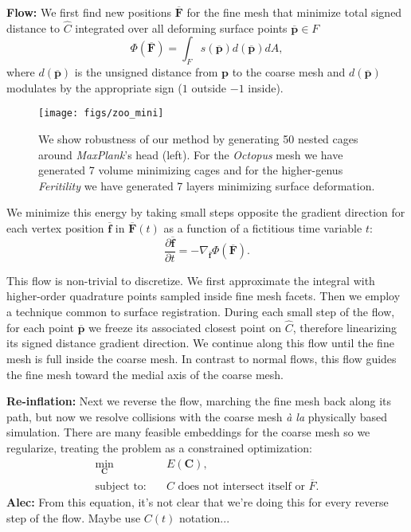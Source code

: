 \documentclass{cgyrf15}
\newcommand{\alec}[1]{{\textcolor[rgb]{0.1,0.6,0.1}{\textbf{Alec:} #1}}}
\begin{document}
\noindent \textbf{Flow:} We first find new positions $\overline{\mathbf{F}}$ for the fine
mesh that minimize total signed distance to $\hat{C}$ integrated over all
deforming surface points $\overline{\textbf{p}} \in F$ \begin{equation}
\Phi(\overline{\mathbf{F}}) = \int_F s(\overline{\mathbf{p}})
d(\overline{\mathbf{p}}) dA, \label{eq:flow_energy} \end{equation} where
$d(\overline{\mathbf{p}})$ is the unsigned distance from $\mathbf{p}$ to the
coarse mesh and $d(\overline{\mathbf{p}})$ modulates by the appropriate sign
($1$ outside $-1$ inside).


\begin{figure*}[t]
  \texttt{[image: figs/zoo\_mini]}
  \caption{We show robustness of our method by generating 50 nested cages
  around \emph{MaxPlank}'s head (left). For the \emph{Octopus} mesh we have
  generated 7 volume minimizing cages and for the higher-genus
  \emph{Feritility} we have generated 7 layers minimizing surface deformation.
  }
  \label{fig:minizoo}
\end{figure*}

We minimize this energy by taking small steps opposite the gradient direction
for each vertex position $\overline{\mathbf{f}}$ in $\overline{\mathbf{F}}(t)$
as a function of a fictitious time variable $t$:
\begin{equation}
\frac{\partial \overline{\mathbf{f}}}{\partial t} = - \nabla_{\overline{\mathbf{f}}} \Phi(\overline{\mathbf{F}}).
\label{eq:energy_gradient}
\end{equation}

This flow is non-trivial to discretize. We first approximate the integral with
higher-order quadrature points sampled inside fine mesh facets. Then we employ
a technique common to surface registration. During each small step of the flow,
for each point $\overline{\textbf{p}}$ we freeze its associated closest point
on $\hat{C}$, therefore linearizing its signed distance gradient direction. We
continue along this flow until the fine mesh is full inside the coarse mesh. In
contrast to normal flows, this flow guides the fine mesh toward the medial axis
of the coarse mesh.

\noindent \textbf{Re-inflation:} Next we reverse the flow,
marching the fine mesh back along its path, but now we resolve collisions with
the coarse mesh \emph{\`{a} la} physically based simulation. There are many
feasible embeddings for the coarse mesh so we regularize, treating the problem
as a constrained optimization:
\begin{align}
\min_{\mathbf{C}}  &\quad E(\mathbf{C}),\\
\text{subject to:} &\quad \text{$C$ does not intersect itself or $\overline{F}$}.
\end{align}
\alec{From this equation, it's not clear that we're doing this for every
reverse step of the flow. Maybe use $C(t)$ notation...}
\end{document}
